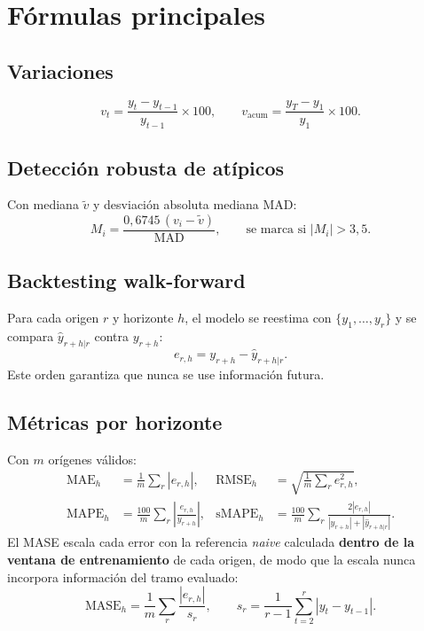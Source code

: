 \documentclass[11pt,letterpaper]{article}
\begin{document}
\section{Fórmulas principales}

\subsection{Variaciones}
\begin{equation}
v_t=\frac{y_t-y_{t-1}}{y_{t-1}}\times 100,
\qquad
v_{\text{acum}}=\frac{y_T-y_1}{y_1}\times 100 .
\end{equation}

\subsection{Detección robusta de atípicos}
Con mediana \(\tilde{v}\) y desviación absoluta mediana \(\mathrm{MAD}\):
\begin{equation}
M_i=\frac{0{,}6745\,(v_i-\tilde{v})}{\mathrm{MAD}},
\qquad \text{se marca si } |M_i|>3{,}5 .
\end{equation}

\subsection{Backtesting walk-forward}
Para cada origen \(r\) y horizonte \(h\), el modelo se reestima con
\(\{y_1,\dots,y_r\}\) y se compara \(\hat y_{r+h|r}\) contra \(y_{r+h}\):
\begin{equation}
e_{r,h}=y_{r+h}-\hat y_{r+h|r}.
\end{equation}
Este orden garantiza que nunca se use información futura.

\subsection{Métricas por horizonte}
Con \(m\) orígenes válidos:
\begin{align}
\mathrm{MAE}_h&=\frac{1}{m}\sum_r |e_{r,h}|, &
\mathrm{RMSE}_h&=\sqrt{\frac{1}{m}\sum_r e_{r,h}^{2}},\\
\mathrm{MAPE}_h&=\frac{100}{m}\sum_r\left|\frac{e_{r,h}}{y_{r+h}}\right|, &
\mathrm{sMAPE}_h&=\frac{100}{m}\sum_r\frac{2|e_{r,h}|}{|y_{r+h}|+|\hat y_{r+h|r}|}.
\end{align}
El MASE escala cada error con la referencia \emph{naive} calculada
\textbf{dentro de la ventana de entrenamiento} de cada origen, de modo que la
escala nunca incorpora información del tramo evaluado:
\begin{equation}
\mathrm{MASE}_h=\frac{1}{m}\sum_r \frac{|e_{r,h}|}{s_r},
\qquad
s_r=\frac{1}{r-1}\sum_{t=2}^{r}|y_t-y_{t-1}| .
\end{equation}
\end{document}
